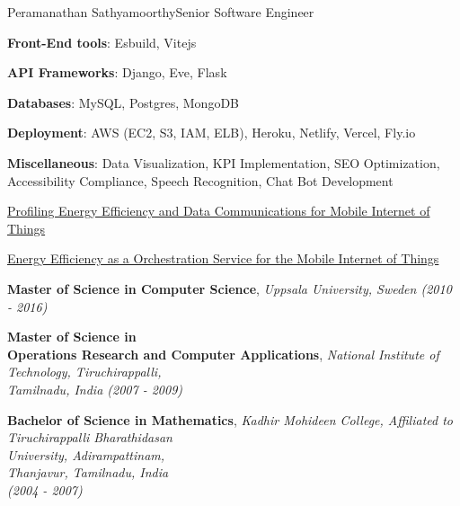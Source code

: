 \documentclass{article}
\begin{document}
\begin{cv}[cvpicture]{Peramanathan Sathyamoorthy}{Senior Software Engineer}
    \vspace{0.26em}

    \textbf{Front-End tools}: Esbuild, Vitejs

    \vspace{0.26em}

    \textbf{API Frameworks}: Django, Eve, Flask

    \vspace{0.26em}

    \textbf{Databases}: MySQL, Postgres, MongoDB

    \vspace{0.26em}

    \textbf{Deployment}: AWS (EC2, S3, IAM, ELB), Heroku, Netlify, Vercel, Fly.io

    \vspace{0.26em}

    \textbf{Miscellaneous}: Data Visualization, KPI Implementation, SEO Optimization, Accessibility Compliance, Speech Recognition, Chat Bot Development


{\href{https://onlinelibrary.wiley.com/doi/10.1155/2017/6562915}{Profiling Energy Efficiency and Data Communications for Mobile Internet of Things}}

\vspace{0.5em}

{\href{https://ieeexplore.ieee.org/abstract/document/7396150}{Energy Efficiency as a Orchestration Service for the Mobile Internet of Things}}

\vspace{0.5em}

  \textbf{Master of Science in Computer Science}, \textit{Uppsala University, Sweden (2010 - 2016)}

  \vspace{0.5em}

  \textbf{Master of Science in \\ Operations Research and Computer Applications}, \textit{National Institute of Technology, Tiruchirappalli, \\ Tamilnadu, India (2007 - 2009)}

  \vspace{0.5em}

  \textbf{Bachelor of Science in Mathematics}, \textit{Kadhir Mohideen College, Affiliated to Tiruchirappalli Bharathidasan \\ University, Adirampattinam, \\ Thanjavur, Tamilnadu, India \\ (2004 - 2007)}



\end{cv}

\end{document}
